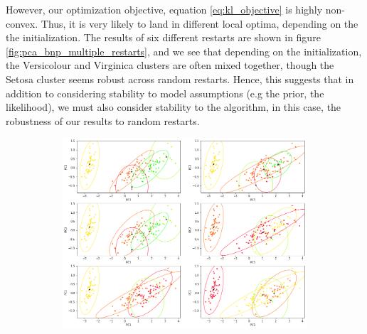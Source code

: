 \documentclass[a4paper]{article}
\begin{document}
However, our optimization objective, equation \ref{eq:kl_objective} is highly non-convex. Thus,
it is very likely to land in different local optima, depending on the the initialization. The results
of six different restarts are shown in figure \ref{fig:pca_bnp_multiple_restarts}, and we see that
depending on the initialization, the Versicolour and Virginica clusters are often mixed together, though
the Setosa cluster seems robust across random restarts. Hence, this suggests that in addition to considering
stability to model assumptions (e.g the prior, the likelihood), we must also consider stability to the
algorithm, in this case, the robustness of our results to random restarts.

\begin{figure}[h!]
	\centering
	\begin{subfigure}[t]{0.6\textwidth}
		\includegraphics[width = \textwidth]{./data_figs/pca_bnp_multiple_clustering.png}
	\end{subfigure}
  \begin{subfigure}[t]{0.39\textwidth}

\end{subfigure}
\end{figure}
\end{document}
